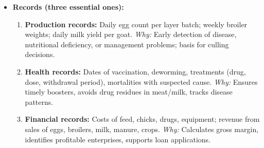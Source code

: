 \documentclass[11pt]{article}
\begin{document}
\begin{itemize}
\begin{itemize}
\item \emph{General:} Isolate and treat any sick animal immediately; disinfect houses between batches; control rodents and wild birds.
\end{itemize}
\item \textbf{Records (three essential ones):}
\begin{enumerate}
\item \textbf{Production records:} Daily egg count per layer batch; weekly broiler weights; daily milk yield per goat. \emph{Why:} Early detection of disease, nutritional deficiency, or management problems; basis for culling decisions.
\item \textbf{Health records:} Dates of vaccination, deworming, treatments (drug, dose, withdrawal period), mortalities with suspected cause. \emph{Why:} Ensures timely boosters, avoids drug residues in meat/milk, tracks disease patterns.
\item \textbf{Financial records:} Costs of feed, chicks, drugs, equipment; revenue from sales of eggs, broilers, milk, manure, crops. \emph{Why:} Calculates gross margin, identifies profitable enterprises, supports loan applications.
\end{enumerate}
\end{itemize}
\end{document}
